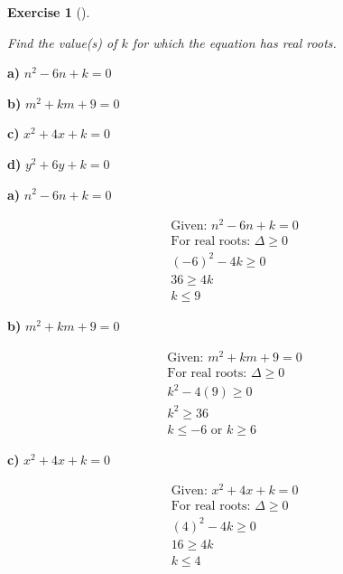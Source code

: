 \documentclass[
  letterpaper,
  DIV=11,
  numbers=noendperiod]{scrreprt}
\theoremstyle{definition}
\newtheorem{exercise}{Exercise}[chapter]
\theoremstyle{remark}
\begin{document}
\begin{exercise}[]\protect\hypertarget{exr-u6-24}{}\label{exr-u6-24}

\emph{Find the value(s) of \(k\) for which the equation has real roots.}

\textbf{a)} \(\displaystyle n^2 - 6n + k = 0\)

\textbf{b)} \(\displaystyle m^2 + km + 9 = 0\)

\textbf{c)} \(\displaystyle x^2 + 4x + k = 0\)

\textbf{d)} \(\displaystyle y^2 + 6y + k = 0\)

\begin{tcolorbox}[enhanced jigsaw, opacitybacktitle=0.6, coltitle=black, arc=.35mm, colframe=quarto-callout-tip-color-frame, colback=white, bottomrule=.15mm, left=2mm, colbacktitle=quarto-callout-tip-color!10!white, titlerule=0mm, opacityback=0, title=\textcolor{quarto-callout-tip-color}{\faLightbulb}\hspace{0.5em}{🔍 View Solutions}, leftrule=.75mm, breakable, rightrule=.15mm, bottomtitle=1mm, toptitle=1mm, toprule=.15mm]

\textbf{a)} \(\displaystyle n^2 - 6n + k = 0\)

\begin{align*}
\text{Given: } n^2 - 6n + k = 0 \\ \text{For real roots: } \Delta \geq 0 \\ (-6)^2 - 4k \geq 0 \\ 36 \geq 4k \\ k \leq 9
\end{align*}

\textbf{b)} \(\displaystyle m^2 + km + 9 = 0\)

\begin{align*}
\text{Given: } m^2 + km + 9 = 0 \\ \text{For real roots: } \Delta \geq 0 \\ k^2 - 4(9) \geq 0 \\ k^2 \geq 36 \\ k \leq -6 \text{ or } k \geq 6
\end{align*}

\textbf{c)} \(\displaystyle x^2 + 4x + k = 0\)

\begin{align*}
\text{Given: } x^2 + 4x + k = 0 \\ \text{For real roots: } \Delta \geq 0 \\ (4)^2 - 4k \geq 0 \\ 16 \geq 4k \\ k \leq 4
\end{align*}


\end{tcolorbox}
\end{exercise}
\end{document}
